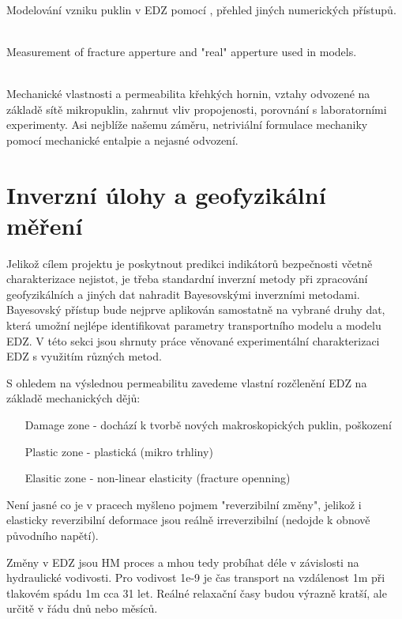 \documentclass{article}
\begin{document}
{\bf \cite{Lisjak2014}}\\
Modelování vzniku puklin v EDZ pomocí ,
přehled jiných numerických přístupů. 

{\bf  \cite{Barton1985}}\\
Measurement of fracture apperture and "real" apperture used in models.

{\bf \cite{Shao2005}}\\
Mechanické vlastnosti a permeabilita křehkých hornin, vztahy odvozené na základě sítě mikropuklin, zahrnut vliv propojenosti, porovnání s laboratorními experimenty. Asi nejblíže našemu záměru, netriviální formulace mechaniky pomocí mechanické entalpie a nejasné odvození.


\section{Inverzní úlohy a geofyzikální měření}
Jelikož cílem projektu je poskytnout predikci indikátorů bezpečnosti 
včetně charakterizace nejistot, je třeba standardní inverzní metody při zpracování geofyzikálních a jiných dat nahradit Bayesovskými inverzními metodami. Bayesovský přístup bude nejprve aplikován samostatně na vybrané druhy dat, která umožní nejlépe identifikovat parametry transportního modelu a modelu EDZ. V této sekci jsou shrnuty práce věnované experimentální charakterizaci EDZ s využitím různých metod.

S ohledem na výslednou permeabilitu zavedeme vlastní rozčlenění EDZ na základě mechanických dějů:
\begin{itemize}
    \item [Damage zone] - dochází k tvorbě nových makroskopických puklin, poškození
    \item [Plastic zone] - plastická (mikro trhliny)
    \item [Elasitic zone] - non-linear elasticity (fracture openning)
\end{itemize}
Není jasné co je v pracech myšleno pojmem "reverzibilní změny", jelikož i elasticky reverzibilní deformace jsou reálně irreverzibilní (nedojde k obnově původního napětí).



Změny v EDZ jsou HM proces a mhou tedy probíhat déle v závislosti na hydraulické vodivosti. Pro vodivost 1e-9 je čas transport na vzdálenost 1m při tlakovém spádu 1m cca 31 let. Reálné relaxační časy budou výrazně kratší, ale určitě v řádu dnů nebo měsíců. 
\end{document}
